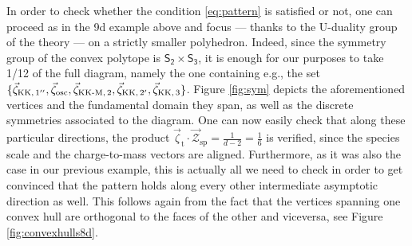 In order to check whether the condition \eqref{eq:pattern} is satisfied or not, one can proceed as in the 9d example above and focus --- thanks to the U-duality group of the theory --- on a strictly smaller polyhedron. Indeed, since the symmetry group of the convex polytope is $\mathsf{S_2}\times \mathsf{S_3}$, it is enough for our purposes to take 1/12 of the full diagram, namely the one containing e.g., the set $\lbrace \vec{\zeta}_{\text{KK},\, 1''}, \vec{\zeta}_{\text{osc}}, \vec{\zeta}_{\text{KK-M},\,2}, \vec{\zeta}_{{\rm KK},\, 2'}, \vec{\zeta}_{{\rm KK},\, 3}\rbrace$. Figure \ref{fig:sym} depicts the aforementioned vertices and the fundamental domain they span, as well as the discrete symmetries associated to the diagram. One can now easily check that along these particular directions, the product $\vec{\zeta}_{\text{t}} \cdot \vec{\mathcal{Z}}_{\text{sp}}= \frac{1}{d-2} =\frac{1}{6}$ is verified, since the species scale and the charge-to-mass vectors are aligned. Furthermore, as it was also the case in our previous example, this is actually all we need to check in order to get convinced that the pattern holds along every other intermediate asymptotic direction as well. This follows again from the fact that the vertices spanning one convex hull are orthogonal to the faces of the other and viceversa, see Figure \ref{fig:convexhulls8d}.
	
